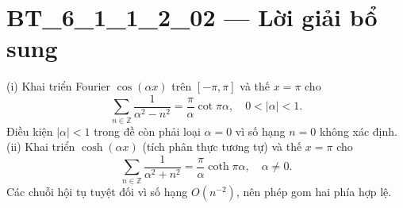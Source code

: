 \documentclass[10pt,a4paper]{article}
\begin{document}
\section*{BT\_6\_1\_1\_2\_02 — Lời giải bổ sung}
(i) Khai triển Fourier $\cos(\alpha x)$ trên $[-\pi,\pi]$ và thế $x=\pi$ cho
\[\sum_{n\in\mathbb Z}\frac1{\alpha^2-n^2}=\frac\pi\alpha\cot\pi\alpha,\quad0<|\alpha|<1.\]
Điều kiện $|\alpha|<1$ trong đề còn phải loại $\alpha=0$ vì số hạng $n=0$ không xác định.
(ii) Khai triển $\cosh(\alpha x)$ (tích phân thực tương tự) và thế $x=\pi$ cho
\[\sum_{n\in\mathbb Z}\frac1{\alpha^2+n^2}=\frac\pi\alpha\coth\pi\alpha,\quad\alpha\ne0.\]
Các chuỗi hội tụ tuyệt đối vì số hạng $O(n^{-2})$, nên phép gom hai phía hợp lệ.
\end{document}
